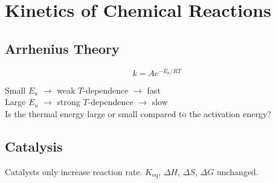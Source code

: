 \columnbreak
\section{Kinetics of Chemical Reactions}

\subsection*{Arrhenius Theory}

\begin{equation*}
    k = Ae^{-E_a/RT}
\end{equation*}

Small $E_a$ $\rightarrow$ weak $T$-dependence $\rightarrow$ fast \\
Large $E_a$ $\rightarrow$ strong $T$-dependence $\rightarrow$ slow \\
Is the thermal energy large or small compared to the activation energy?

\subsection*{Catalysis}
Catalysts only increase reaction rate. $K_{\mathrm{eq}}$, $\Delta H$, $\Delta S$, $\Delta G$ unchanged.